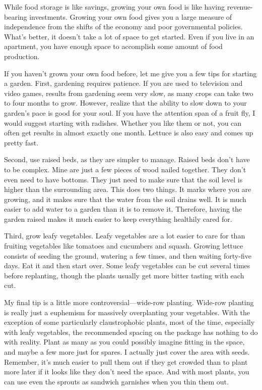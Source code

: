 While food storage is like savings, growing your own food is like having
revenue-bearing investments. Growing your own food gives you a large
measure of independence from the shifts of the economy and poor
governmental policies. What’s better, it doesn’t take a lot of space to
get started. Even if you
live in an apartment,
you have enough space to accomplish some amount of food
production.

If you haven’t grown your own food before, let me give you a few tips
for starting a
garden. First, gardening requires patience. If you are used to
television and video games, results from gardening seem very slow, as
many crops can take two to four months to grow. However, realize that
the ability to slow down to your garden’s pace is good for your soul.
If you have the attention span of a fruit fly, I would suggest starting
with radishes. Whether you like them or not, you can often get results
in almost exactly one month. Lettuce is also easy and comes up pretty
fast.

Second, use raised beds, as they are simpler to manage. Raised beds
don’t have to be complex. Mine are just a few pieces of wood nailed
together. They don’t even need to have bottoms. They just need to make
sure that the soil level is higher than the surrounding area. This does
two things. It marks where you are growing, and it makes sure that the
water from the soil drains well. It is much easier to add water to a
garden than it is to remove it. Therefore, having the garden raised
makes it much easier to keep everything healthily cared for. 

Third, grow leafy vegetables. Leafy vegetables are a lot easier to care
for than fruiting vegetables like tomatoes and cucumbers and squash.
Growing lettuce consists of seeding the ground, watering a few times,
and then waiting forty-five days. Eat it and then start over. Some
leafy vegetables can be cut several times before replanting, though the
plants usually get more bitter tasting with each cut. 

My final tip is a little more controversial—wide-row planting. Wide-row
planting is really just a euphemism for massively overplanting your
vegetables. With the exception of some particularly claustrophobic
plants, most of the time, especially with leafy vegetables, the
recommended spacing on the package has nothing to do with reality.
Plant as many as you could possibly imagine fitting in the space, and
maybe a few more just for spares. I actually just cover the area with
seeds. Remember, it’s much easier to pull them out if they get crowded
than to plant more later if it looks like they don’t need the space.
And with most plants, you can use even the sprouts as sandwich
garnishes when you thin them out.

